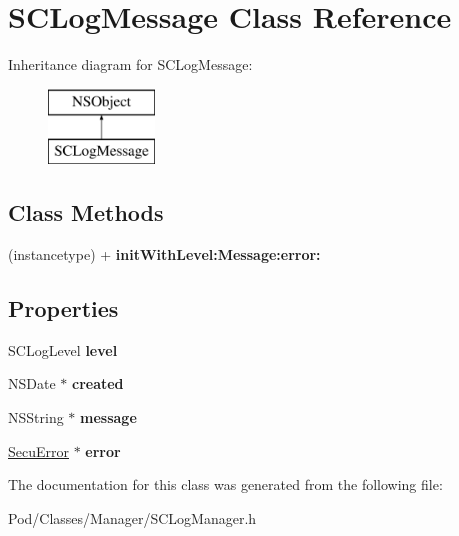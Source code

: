 \hypertarget{interface_s_c_log_message}{}\section{S\+C\+Log\+Message Class Reference}
\label{interface_s_c_log_message}
Inheritance diagram for S\+C\+Log\+Message\+:\begin{figure}[H]
\begin{center}
\leavevmode
\includegraphics[height=2.000000cm]{interface_s_c_log_message}
\end{center}
\end{figure}
\subsection*{Class Methods}
\begin{DoxyCompactItemize}
\item 
(instancetype) + {\bfseries init\+With\+Level\+:\+Message\+:error\+:}\hypertarget{interface_s_c_log_message_a27ec566c05631ce049371a79937292dc}{}\label{interface_s_c_log_message_a27ec566c05631ce049371a79937292dc}

\end{DoxyCompactItemize}
\subsection*{Properties}
\begin{DoxyCompactItemize}
\item 
S\+C\+Log\+Level {\bfseries level}\hypertarget{interface_s_c_log_message_a48d5e6f4718a6bea52313370fb8605e6}{}\label{interface_s_c_log_message_a48d5e6f4718a6bea52313370fb8605e6}

\item 
N\+S\+Date $\ast$ {\bfseries created}\hypertarget{interface_s_c_log_message_a5cc9b6c405e76871cd10762426649d8c}{}\label{interface_s_c_log_message_a5cc9b6c405e76871cd10762426649d8c}

\item 
N\+S\+String $\ast$ {\bfseries message}\hypertarget{interface_s_c_log_message_ab9f7b56dd27c4250db456439245ac3ca}{}\label{interface_s_c_log_message_ab9f7b56dd27c4250db456439245ac3ca}

\item 
\hyperlink{interface_secu_error}{Secu\+Error} $\ast$ {\bfseries error}\hypertarget{interface_s_c_log_message_a353d012c3d8e5d4f8065371de289e985}{}\label{interface_s_c_log_message_a353d012c3d8e5d4f8065371de289e985}

\end{DoxyCompactItemize}


The documentation for this class was generated from the following file\+:\begin{DoxyCompactItemize}
\item 
Pod/\+Classes/\+Manager/S\+C\+Log\+Manager.\+h\end{DoxyCompactItemize}
